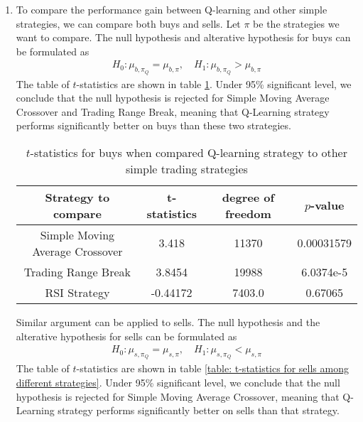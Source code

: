 \documentclass[11pt,a4paper]{article}
\numberwithin{equation}{section}
\begin{document}
\begin{enumerate}
  \item
        To compare the performance gain between Q-learning and other simple strategies, we can compare both buys and sells. Let $\pi$ be the strategies we want to compare. The null hypothesis and alterative hypothesis for buys can be formulated as
        \begin{align}
          H_0: \mu_{b, \pi_Q} = \mu_{b, \pi}, \quad H_1: \mu_{b, \pi_Q} > \mu_{b, \pi}
        \end{align}
        The table of $t$-statistics are shown in table \ref{table: t-statistics for buys among different strategies}. Under 95\% significant level, we conclude that the null hypothesis is rejected for Simple Moving Average Crossover and Trading Range Break, meaning that Q-Learning strategy performs significantly better on buys than these two strategies.
        \begin{table}[]
          \centering
          \begin{tabular}{@{}cccc@{}}
            \toprule
            Strategy to compare             & t-statistics & degree of freedom & $p$-value  \\ \midrule
            Simple Moving Average Crossover & 3.418        & 11370             & 0.00031579 \\
            Trading Range Break             & 3.8454       & 19988             & 6.0374e-5  \\
            RSI Strategy                    & -0.44172     & 7403.0            & 0.67065    \\ \bottomrule
          \end{tabular}
          \label{table: t-statistics for buys among different strategies}
          \caption{$t$-statistics for buys when compared Q-learning strategy to other simple trading strategies}
        \end{table}
        Similar argument can be applied to sells. The null hypothesis and the alterative hypothesis for sells can be formulated as
        \begin{align}
          H_0: \mu_{s, \pi_Q} = \mu_{s, \pi}, \quad H_1: \mu_{s, \pi_Q} < \mu_{s, \pi}
        \end{align}
        The table of $t$-statistics are shown in table \ref{table: t-statistics for sells among different strategies}. Under 95\% significant level, we conclude that the null hypothesis is rejected for Simple Moving Average Crossover, meaning that Q-Learning strategy performs significantly better on sells than that strategy.
        \begin{table}[]

\end{table}
\end{enumerate}
\end{document}
